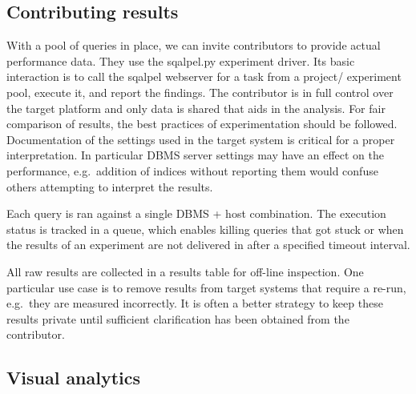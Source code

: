 \documentclass{cidr-2019}
\begin{document}
\subsection{Contributing results}
With a pool of queries in place, we can invite contributors to provide
actual performance data. They use the {\sc sqalpel.py} experiment
driver. Its basic interaction is to call the {\sc sqalpel} webserver
for a task from a project/ experiment pool, execute it, and report the
findings. The contributor is in full control over the target platform
and only data is shared that aids in the analysis. For fair
comparison of results, the best practices of experimentation should be
followed.
Documentation of the settings used in the target system is critical
for a proper interpretation. In particular DBMS server settings may
have an effect on the performance, e.g.\ addition of indices without
reporting them would confuse others attempting to interpret the
results.

Each query is ran against a single DBMS + host combination. The
execution status is tracked in a queue, which enables killing queries
that got stuck or when the results of an experiment are not delivered
in after a specified timeout interval.

All raw results are collected in a results table for off-line
inspection. One particular use case is to remove results from target
systems that require a re-run, e.g.\ they are measured incorrectly. 
It is often a better strategy to keep these results private until
sufficient clarification has been obtained from the contributor.

\subsection{Visual analytics}
\end{document}
